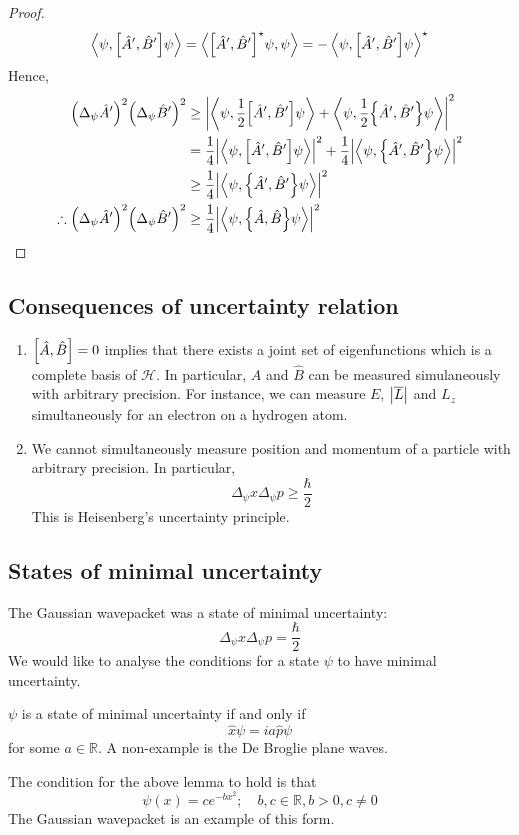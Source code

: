 \begin{proof}
	\[
		\left\langle{\psi, \qty[\hat A', \hat B'] \psi}\right\rangle = \left\langle{\qty[\hat A', \hat B']^\star \psi, \psi}\right\rangle = -\left\langle{\psi, \qty[\hat A', \hat B'] \psi}\right\rangle^\star
	\]
	Hence,
	\begin{align*}
		\qty(\Delta_\psi \hat A')^2 \qty(\Delta_\psi \hat B')^2            & \geq \abs{\left\langle{\psi, \frac{1}{2} \qty[\hat A', \hat B'] \psi}\right\rangle + \left\langle{\psi, \frac{1}{2} \qty{\hat A', \hat B'} \psi}\right\rangle}^2     \\
		                                                                   & = \frac{1}{4} \abs{\left\langle{\psi, \qty[\hat A', \hat B'] \psi}\right\rangle}^2 + \frac{1}{4} \abs{\left\langle{\psi, \qty{\hat A', \hat B'}\psi}\right\rangle}^2 \\
		                                                                   & \geq \frac{1}{4} \abs{\left\langle{\psi, \qty{\hat A', \hat B'} \psi}\right\rangle}^2                                                             \\
		\therefore \qty(\Delta_\psi \hat A')^2 \qty(\Delta_\psi \hat B')^2 & \geq \frac{1}{4} \abs{\left\langle{\psi, \qty{\hat A, \hat B} \psi}\right\rangle}^2
	\end{align*}
\end{proof}

\subsection{Consequences of uncertainty relation}
\begin{enumerate}
	\item \( \qty[\hat A, \hat B] = 0 \) implies that there exists a joint set of eigenfunctions which is a complete basis of \( \mathcal H \).
	      In particular, \( \hat A \) and \( \hat B \) can be measured simulaneously with arbitrary precision.
	      For instance, we can measure \( E \), \( \abs{\overline L} \) and \( L_z \) simultaneously for an electron on a hydrogen atom.
	\item We cannot simultaneously measure position and momentum of a particle with arbitrary precision.
	      In particular,
	      \[
		      \Delta_\psi x \Delta_\psi p \geq \frac{\hbar}{2}
	      \]
	      This is Heisenberg's uncertainty principle.
\end{enumerate}

\subsection{States of minimal uncertainty}
The Gaussian wavepacket was a state of minimal uncertainty:
\[
	\Delta_\psi x \Delta_\psi p = \frac{\hbar}{2}
\]
We would like to analyse the conditions for a state \( \psi \) to have minimal uncertainty.
\begin{lemma}
	\( \psi \) is a state of minimal uncertainty if and only if
	\[
		\hat x \psi = i a \hat p \psi
	\]
	for some \( a \in \mathbb R \).
	A non-example is the De Broglie plane waves.
\end{lemma}
\begin{lemma}
	The condition for the above lemma to hold is that
	\[
		\psi(x) = ce^{-bx^2};\quad b,c \in \mathbb R, b > 0, c \neq 0
	\]
	The Gaussian wavepacket is an example of this form.
\end{lemma}

